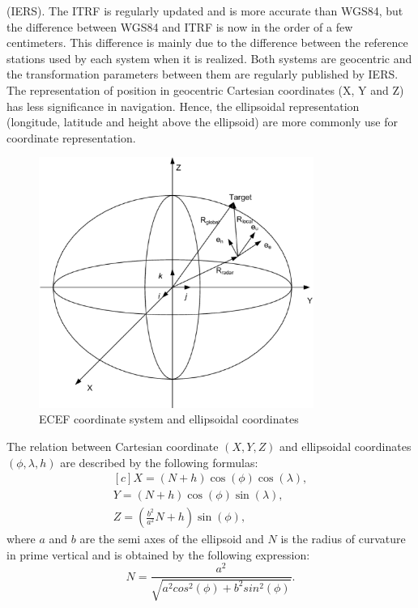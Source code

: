 (IERS). The ITRF is regularly updated and is more accurate than WGS84, but the difference
between WGS84 and ITRF is now in the order of a few centimeters. This difference is mainly
due to the difference between the reference stations used by each system when it is realized.
Both systems are geocentric and the transformation parameters between them are regularly
published by IERS.
The representation of position in geocentric Cartesian coordinates (X, Y and Z) has less
significance in navigation. Hence, the ellipsoidal representation (longitude, latitude and height
above the ellipsoid) are more commonly use for coordinate representation.
\begin{figure}[htb] 
	\label{fig:ecef_coordinate}
	\centering
	\includegraphics[width=0.8\textwidth]{figures/ecef_coordinate}
	\caption{ECEF coordinate system and ellipsoidal coordinates}
\end{figure}
The relation between Cartesian coordinate $(X,Y,Z)$ and ellipsoidal coordinates 
$( \phi , \lambda , h )$ are described by the following formulas:
\begin{equation}
	\label{equ:ecef}
	\begin{aligned}[c]
		X = (N+h)\cos(\phi)\cos(\lambda),\\
		Y = (N+h)\cos(\phi)\sin(\lambda),\\
		Z = (\frac{b^{2}}{a^{2}}N+h)\sin(\phi),
	\end{aligned}
\end{equation}
where $a$ and $b$ are the semi axes of the ellipsoid and $N$ is the radius of curvature in 
prime vertical and is obtained by the following expression:
\begin{equation}
	\label{equ:curvature}
	N = \frac{a^{2}}{\sqrt{a^{2}cos^{2}(\phi)+b^{2}sin^{2}(\phi)}}.
\end{equation}
